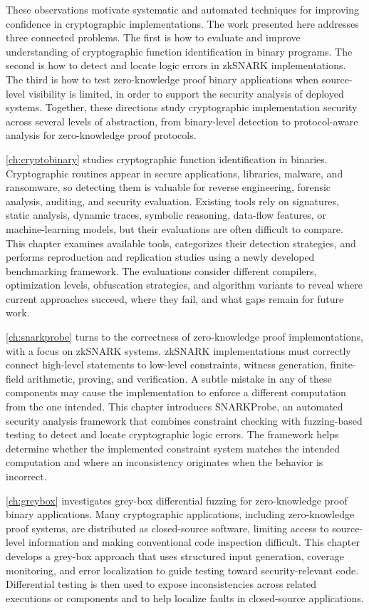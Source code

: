 These observations motivate systematic and automated techniques for improving confidence in cryptographic implementations. The work presented here addresses three connected problems. The first is how to evaluate and improve understanding of cryptographic function identification in binary programs. The second is how to detect and locate logic errors in zkSNARK implementations. The third is how to test zero-knowledge proof binary applications when source-level visibility is limited, in order to support the security analysis of deployed systems. Together, these directions study cryptographic implementation security across several levels of abstraction, from binary-level detection to protocol-aware analysis for zero-knowledge proof protocols.

\autoref{ch:cryptobinary} studies cryptographic function identification in binaries. Cryptographic routines appear in secure applications, libraries, malware, and ransomware, so detecting them is valuable for reverse engineering, forensic analysis, auditing, and security evaluation. Existing tools rely on signatures, static analysis, dynamic traces, symbolic reasoning, data-flow features, or machine-learning models, but their evaluations are often difficult to compare. This chapter examines available tools, categorizes their detection strategies, and performs reproduction and replication studies using a newly developed benchmarking framework. The evaluations consider different compilers, optimization levels, obfuscation strategies, and algorithm variants to reveal where current approaches succeed, where they fail, and what gaps remain for future work.

\autoref{ch:snarkprobe} turns to the correctness of zero-knowledge proof implementations, with a focus on zkSNARK systems. zkSNARK implementations must correctly connect high-level statements to low-level constraints, witness generation, finite-field arithmetic, proving, and verification. A subtle mistake in any of these components may cause the implementation to enforce a different computation from the one intended. This chapter introduces SNARKProbe, an automated security analysis framework that combines constraint checking with fuzzing-based testing to detect and locate cryptographic logic errors. The framework helps determine whether the implemented constraint system matches the intended computation and where an inconsistency originates when the behavior is incorrect.

\autoref{ch:greybox} investigates grey-box differential fuzzing for zero-knowledge proof binary applications. Many cryptographic applications, including zero-knowledge proof systems, are distributed as closed-source software, limiting access to source-level information and making conventional code inspection difficult. This chapter develops a grey-box approach that uses structured input generation, coverage monitoring, and error localization to guide testing toward security-relevant code. Differential testing is then used to expose inconsistencies across related executions or components and to help localize faults in closed-source \zksnark applications.

